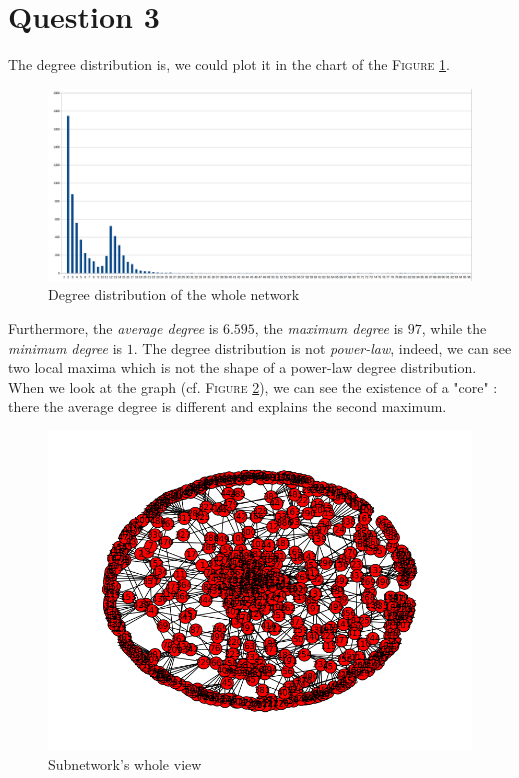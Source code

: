 \documentclass[a4paper]{report}
\begin{document}
\section*{Question 3}

The degree distribution is, we could plot it in the chart of the \textsc{Figure} \ref{fig:total}.
\medbreak

\begin{figure}[!h]
	\includegraphics[scale=.17]{./total.png}
	\caption{Degree distribution of the whole network}
	\label{fig:total}
\end{figure}

Furthermore, the \textit{average degree} is $6.595$, the \textit{maximum degree} is $97$, while the \textit{minimum degree} is $1$. 
\medbreak
The degree distribution is not \textit{power-law}, indeed, we can see two local maxima which is not the shape of a power-law degree distribution. \\
When we look at the graph (cf. \textsc{Figure} \ref{fig:graph}), we can see the existence of a "core" : there the average degree is different and explains the second maximum.

\begin{figure}[!h]
	\includegraphics[scale=.6]{./figure_1.png}
	\caption{Subnetwork's whole view}
	\label{fig:graph}
\end{figure}
\end{document}
